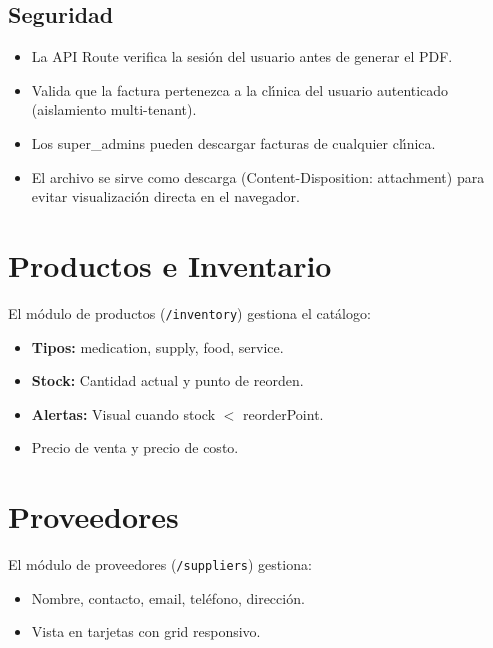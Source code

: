 \subsection{Seguridad}

\begin{itemize}[leftmargin=*]
    \item La API Route verifica la sesi\'on del usuario antes de generar
          el PDF.
    \item Valida que la factura pertenezca a la cl\'{\i}nica del usuario
          autenticado (aislamiento multi-tenant).
    \item Los super\_admins pueden descargar facturas de cualquier
          cl\'{\i}nica.
    \item El archivo se sirve como descarga (Content-Disposition:
          attachment) para evitar visualizaci\'on directa en el navegador.
\end{itemize}

\section{Productos e Inventario}

El m\'odulo de productos (\texttt{/inventory}) gestiona el cat\'alogo:

\begin{itemize}[leftmargin=*]
    \item \textbf{Tipos:} medication, supply, food, service.
    \item \textbf{Stock:} Cantidad actual y punto de reorden.
    \item \textbf{Alertas:} Visual cuando stock $<$ reorderPoint.
    \item Precio de venta y precio de costo.
\end{itemize}

\section{Proveedores}

El m\'odulo de proveedores (\texttt{/suppliers}) gestiona:

\begin{itemize}[leftmargin=*]
    \item Nombre, contacto, email, tel\'efono, direcci\'on.
    \item Vista en tarjetas con grid responsivo.
\end{itemize}
